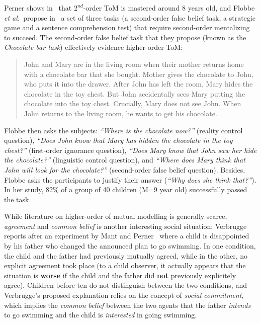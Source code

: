\documentclass{sig-alternate}
\newcommand{\etal}{{\textit{et al.~}}}
\begin{document}
Perner shows in~\cite{perner1988higher} that $2^{nd}$-order ToM is
mastered around 8 years old, and Flobbe \etal propose
in~\cite{flobbe2008children} a set of three tasks (a second-order false belief
task, a strategic game and a sentence comprehension test) that require
second-order mentalizing to succeed. The second-order false belief task that
they propose (known as the \emph{Chocolate bar task}) effectively evidence
higher-order ToM: \begin{quote} John and Mary are in the living room when their
mother returns home with a chocolate bar that she bought. Mother gives the
chocolate to John, who puts it into the drawer. After John has left the
room, Mary hides the chocolate in the toy chest. But John accidentally sees
Mary putting the chocolate into the toy chest. Crucially, Mary does not see
John. When John returns to the living room, he wants to get his chocolate.
\end{quote}

Flobbe then asks the subjects: \emph{``Where is the chocolate now?''} (reality
control question), \emph{``Does John know that Mary has hidden the chocolate in
the toy chest?''} (first-order ignorance question), \emph{``Does Mary know that
John saw her hide the chocolate?''} (linguistic control question), and
\emph{``Where does Mary think that John will look for the chocolate?''}
(second-order false belief question). Besides, Flobbe asks the participants to
justify their answer (\emph{``Why does she think that?''}). In her study, 82\%
of a group of 40 children (M=9 year old) successfully passed the task.

While literature on higher-order of mutual modelling is generally scarce, \emph{agreement}
and \emph{common belief} is another interesting social situation:
Verbrugge~\cite[p.~664]{verbrugge2009logic} reports after an experiment by Mant
and Perner~\cite{mant1988child} where a child is disappointed by his father who
changed the announced plan to go swimming. In one condition, the child and the
father had previously mutually agreed, while in the other, no explicit agreement
took place (to a child observer, it actually appears that the situation is
\textbf{worse} if the child and the father did \textbf{not} previously
explicitely agree). Children before ten do not
distinguish between the two conditions, and Verbrugge's proposed explanation
relies on the concept of \emph{social commitment}, which implies
the \emph{common belief} between the two agents that the father \emph{intends} to
go swimming and the child is \emph{interested} in going swimming.
\end{document}
